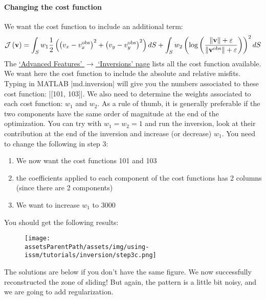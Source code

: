 \paragraph{Changing the cost function}
We want the cost function to include an additional term:
\begin{equation}
	{\mathcal J\left({\bf v}\right)}
	=\int_{S} w_1 \dfrac{1}{2}\left(
	\left(v_x-v_x^{\text{obs}}\right)^{2}
	+\left(v_y-v_y^{\text{obs}}\right)^{2}
	\right) dS
	+\int_{S} w_2 \left(\text{log}\left(
	\dfrac{\|{\bf v}\|+\varepsilon}{\|{\bf v}^{\text{obs}}\|+\varepsilon}
	\right) \right)^2 dS
\end{equation}
The 
\hyperref[sec:using-issm-advanced-inversions]{`Advanced Features' $\rightarrow$ `Inversions' page}
lists all the cost function available. We want here the cost function to include the absolute and relative misfits. Typing in MATLAB \lstinlinebg|md.inversion| will give you the numbers associated to these cost function: \lstinlinebg|[101, 103]|. We also need to determine the weights associated to each cost function: $w_1$ and $w_2$. As a rule of thumb, it is generally preferable if the two components have the same order of magnitude at the end of the optimization. You can try with $w_1=w_2=1$ and run the inversion, look at their contribution at the end of the inversion and increase (or decrease) $w_1$. You need to change the following in step 3:
\begin{enumerate}
	\item We now want the cost functions 101 and 103
	\item the coefficients applied to each component of the cost functions has 2 columns (since there are 2 components)
	\item We want to increase $w_1$ to 3000
\end{enumerate}
You should get the following results:
\begin{figure}[H]
	\begin{center}
		\texttt{[image: \\assetsParentPath/assets/img/using-issm/tutorials/inversion/step3c.png]}
	\end{center}
\end{figure}
The solutions are below if you don't have the same figure. We now successfully reconstructed the zone of sliding! But again, the pattern is a little bit noisy, and we are going to add regularization.

